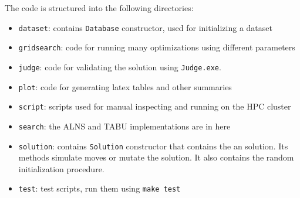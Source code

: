 The code is structured into the following directories:

\begin{itemize}[noitemsep]
\item \texttt{dataset}: contains \texttt{Database} constructor, used for initializing a dataset
\item \texttt{gridsearch}: code for running many optimizations using different parameters
\item \texttt{judge}: code for validating the solution using \texttt{Judge.exe}.
\item \texttt{plot}: code for generating latex tables and other summaries
\item \texttt{script}: scripts used for manual inspecting and running on the HPC cluster
\item \texttt{search}: the ALNS and TABU implementations are in here
\item \texttt{solution}: contains \texttt{Solution} constructor that contains the an solution. Its
 methods simulate moves or mutate the solution. It also contains the random
 initialization procedure.
\item \texttt{test}: test scripts, run them using \texttt{make test}
\end{itemize}
